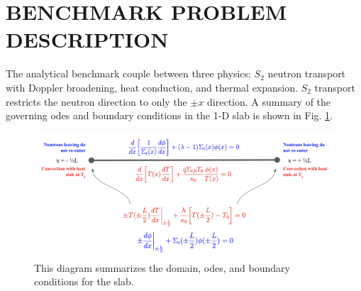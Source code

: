 \documentclass[letterpaper]{mc2023}
\begin{document}
\section{BENCHMARK PROBLEM DESCRIPTION}
\label{sec:benchmark}
The analytical benchmark couple between three physics: $S_2$ neutron transport with Doppler broadening, heat conduction,
and thermal expansion. $S_{2}$ transport restricts the neutron direction to only the $\pm x$ direction. A summary of the governing
\glspl{ode} and boundary conditions in the 1-D slab is shown in Fig. \ref{fig:slab_diagram}.
\begin{figure}[H]
    \centering
    \includegraphics[width=0.65\linewidth]{figures/1D_Benchmark_Diagram.png}
    \caption{This diagram summarizes the domain, \glspl{ode}, and boundary conditions for the slab.}
    \label{fig:slab_diagram}
\end{figure}
\end{document}
